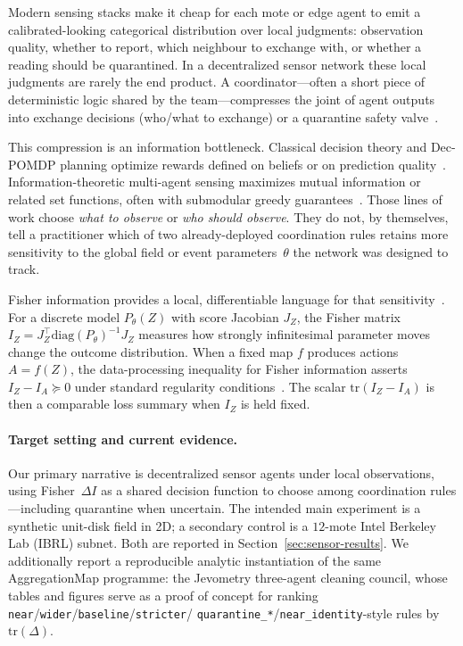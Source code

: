 \documentclass[11pt,a4paper]{article}
\begin{document}
Modern sensing stacks make it cheap for each mote or edge agent to emit a
calibrated-looking categorical distribution over local judgments: observation
quality, whether to report, which neighbour to exchange with, or whether a
reading should be quarantined. In a decentralized sensor network these local
judgments are rarely the end product. A coordinator---often a short piece of
deterministic logic shared by the team---compresses the joint of agent outputs
into exchange decisions (who/what to exchange) or a quarantine safety
valve~\citep{jevometry2026}.

This compression is an information bottleneck. Classical decision theory and
Dec-POMDP planning optimize rewards defined on beliefs or on prediction
quality~\citep{lauri2020prediction,lauri2020decpomdp,oliehoek2016decpomdp}.
Information-theoretic multi-agent sensing maximizes mutual information or
related set functions, often with submodular greedy
guarantees~\citep{krause2008near,nemhauser1978analysis,corah2021scalable,shi2026imas2}.
Those lines of work choose \emph{what to observe} or \emph{who should
observe}. They do not, by themselves, tell a practitioner which of two
already-deployed coordination rules retains more sensitivity to the global
field or event parameters~$\theta$ the network was designed to track.

Fisher information provides a local, differentiable language for that
sensitivity~\citep{fisher1925theory,amari2016information}. For a
discrete model $P_\theta(Z)$ with score Jacobian $J_Z$, the Fisher matrix
$I_Z=J_Z^\top \mathrm{diag}(P_\theta)^{-1} J_Z$ measures how strongly
infinitesimal parameter moves change the outcome distribution. When a fixed
map $f$ produces actions $A=f(Z)$, the data-processing inequality for Fisher
information asserts $I_Z-I_A\succeq 0$ under standard regularity
conditions~\citep{zamir1998fisherdpi,cover2006elements}. The scalar
$\mathrm{tr}(I_Z-I_A)$ is then a comparable loss summary when $I_Z$ is held
fixed.

\paragraph{Target setting and current evidence.}
Our primary narrative is decentralized sensor agents under local observations,
using Fisher~$\Delta I$ as a shared decision function to choose among
coordination rules---including quarantine when uncertain. The intended main
experiment is a synthetic unit-disk field in 2D; a secondary control is a
$12$-mote Intel Berkeley Lab (IBRL) subnet. Both are reported in
Section~\ref{sec:sensor-results}. We additionally report a reproducible analytic instantiation of the same
AggregationMap programme: the Jevometry three-agent cleaning council, whose
tables and figures serve as a proof of concept for ranking
\texttt{near}/\texttt{wider}/\texttt{baseline}/\texttt{stricter}/
\texttt{quarantine\_*}/\texttt{near\_identity}-style rules by
$\mathrm{tr}(\Delta)$.
\end{document}
